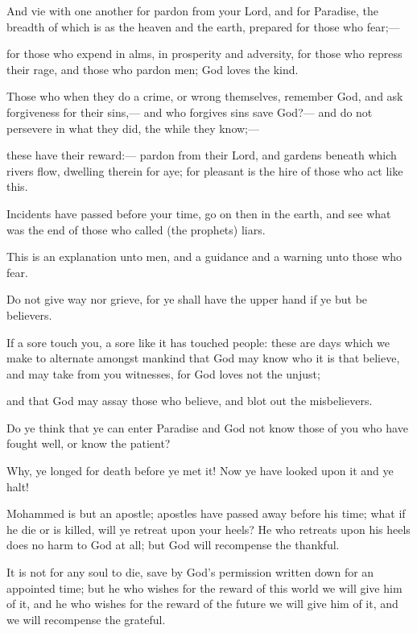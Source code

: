 \documentclass[fontsize=14pt, letterpaper, notitlepage, openany, DIV=12]{scrbook} %
\begin{document}
\noindent[3:133]
And vie with one another for pardon from your Lord, and for Paradise, the breadth of
which is as the heaven and the earth, prepared for those who fear;---

\noindent[3:134]
for those who expend in alms, in prosperity and adversity, for those who repress their
rage, and those who pardon men; God loves the kind.

\noindent[3:135]
Those who when they do a crime, or wrong themselves, remember God, and ask
forgiveness for their sins,--- and who forgives sins save God?--- and do not persevere in what
they did, the while they know;---

\noindent[3:136]
these have their reward:--- pardon from their Lord, and gardens beneath which rivers
flow, dwelling therein for aye; for pleasant is the hire of those who act like this.

\noindent[3:137]
Incidents have passed before your time, go on then in the earth, and see what was the end
of those who called (the prophets) liars.

\noindent[3:138]
This is an explanation unto men, and a guidance and a warning unto those who fear.

\noindent[3:139]
Do not give way nor grieve, for ye shall have the upper hand if ye but be believers.

\noindent[3:140]
If a sore touch you, a sore like it has touched people: these are days which we make to
alternate amongst mankind that God may know who it is that believe, and may take from you
witnesses, for God loves not the unjust;

\noindent[3:141]
and that God may assay those who believe, and blot out the misbelievers.

\noindent[3:142]
Do ye think that ye can enter Paradise and God not know those of you who have fought
well, or know the patient?

\noindent[3:143]
Why, ye longed for death before ye met it! Now ye have looked upon it and ye halt!

\noindent[3:144]
Mohammed is but an apostle; apostles have passed away before his time; what if he die
or is killed, will ye retreat upon your heels? He who retreats upon his heels does no harm to God
at all; but God will recompense the thankful.

\noindent[3:145]
It is not for any soul to die, save by God's permission written down for an appointed
time; but he who wishes for the reward of this world we will give him of it, and he who wishes
for the reward of the future we will give him of it, and we will recompense the grateful.
\end{document}
